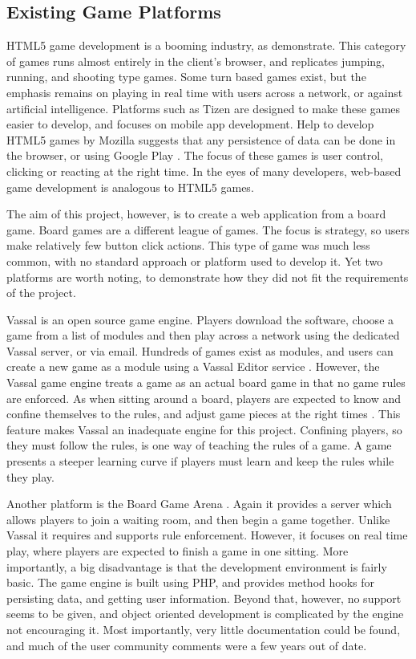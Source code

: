 \subsection{Existing Game Platforms}
HTML5 game development is a booming industry, as \cite{BrowserGames} demonstrate. This category of games runs almost entirely in the client's browser, and replicates jumping, running, and shooting type games. Some turn based games exist, but the emphasis remains on playing in real time with users across a network, or against artificial intelligence. Platforms such as Tizen \cite{Tizen} are designed to make these games easier to develop, and focuses on mobile app development. Help to develop HTML5 games by Mozilla \cite{GameEngAndTools, GameDevCons} suggests that any persistence of data can be done in the browser, or using Google Play \cite{GooglePlay}. The focus of these games is user control, clicking or reacting at the right time. In the eyes of many developers, web-based game development is analogous to HTML5 games.
	
The aim of this project, however, is to create a web application from a board game. Board games are a different league of games. The focus is strategy, so users make relatively few button click actions. This type of game was much less common, with no standard approach or platform used to develop it. Yet two platforms are worth noting, to demonstrate how they did not fit the requirements of the project.
	
Vassal is an open source game engine. Players download the software, choose a game from a list of modules and then play across a network using the dedicated Vassal server, or via email. Hundreds of games exist as modules, and users can create a new game as a module using a Vassal Editor service \cite{Vassal}. However, the Vassal game engine treats a game as an actual board game in that no game rules are enforced. As when sitting around a board, players are expected to know and confine themselves to the rules, and adjust game pieces at the right times \cite{VassalProblem}. This feature makes Vassal an inadequate engine for this project. Confining players, so they must follow the rules, is one way of teaching the rules of a game. A game presents a steeper learning curve if players must learn and keep the rules while they play.
	
Another platform is the Board Game Arena \cite{BGAStudio}. Again it provides a server which allows players to join a waiting room, and then begin a game together. Unlike Vassal it requires and supports rule enforcement. However, it focuses on real time play, where players are expected to finish a game in one sitting. More importantly, a big disadvantage is that the development environment is fairly basic. The game engine is built using PHP, and provides method hooks for persisting data, and getting user information. Beyond that, however, no support seems to be given, and object oriented development is complicated by the engine not encouraging it. Most importantly, very little documentation could be found, and much of the user community comments were a few years out of date.
	
